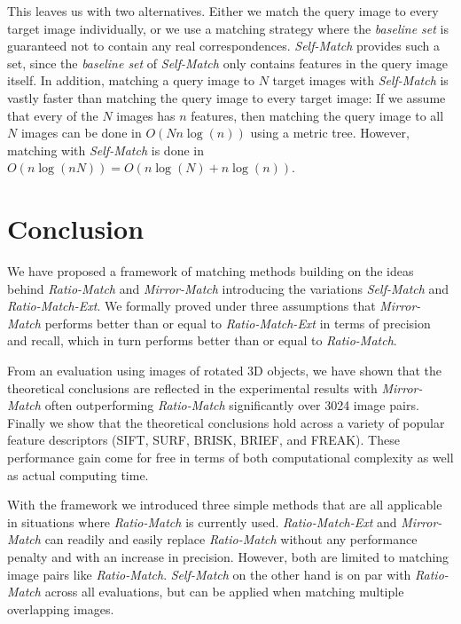 \documentclass[10pt,journal,cspaper,compsoc]{IEEEtran}
\begin{document}
This leaves us with two alternatives. Either we match the query image to 
every target image individually, or we use a matching strategy where the 
\emph{baseline set} is guaranteed not to contain any real 
correspondences. \emph{Self-Match} provides such a set, since the 
\emph{baseline set} of \emph{Self-Match} only contains features in the 
query image itself. In addition, matching a query image to $N$ target 
images with \emph{Self-Match} is vastly faster than matching the query 
image to every target image: If we assume 
that every of the $N$ images has $n$ features, then matching the query 
image to all $N$ images can be done in $O(Nn\log(n))$ using a metric 
tree. However, matching with \emph{Self-Match} is done in $O(n\log(nN)) =
O(n\log(N) + n\log(n))$.

\section{Conclusion}
\label{S:Summary}

We have proposed a framework of matching methods building on the ideas 
behind \emph{Ratio-Match} and \emph{Mirror-Match} introducing the 
variations \emph{Self-Match} and \emph{Ratio-Match-Ext}. We formally proved under three assumptions that \emph{Mirror-Match} performs better than or 
equal to \emph{Ratio-Match-Ext} in terms of precision and recall, which in turn performs better than or equal 
to \emph{Ratio-Match}.

From an evaluation using images of rotated 3D objects, we have shown that
the theoretical conclusions are reflected in the experimental results with 
\emph{Mirror-Match} often outperforming \emph{Ratio-Match}
significantly over 3024 image pairs. Finally we show that the theoretical conclusions hold across a variety of popular feature descriptors (SIFT, SURF, BRISK, BRIEF, and FREAK). These performance gain come for free in 
terms of both computational complexity as well as actual computing time.

With the framework we introduced three simple methods that are all 
applicable in situations where \emph{Ratio-Match} is currently used.  
\emph{Ratio-Match-Ext} and \emph{Mirror-Match} 
can readily and easily replace \emph{Ratio-Match} without any performance penalty 
and with an increase in precision.  However, both are limited to matching 
image pairs like \emph{Ratio-Match}. \emph{Self-Match} on the other hand is on par with \emph{Ratio-Match} across all 
evaluations, but can be applied when matching multiple overlapping images. 
\end{document}
